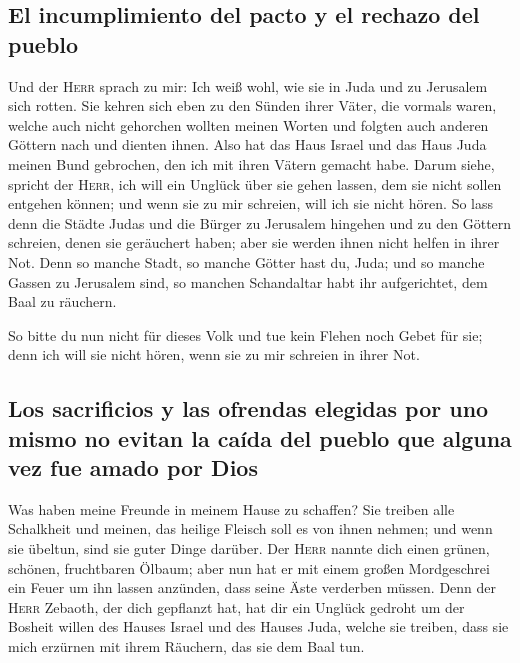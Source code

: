 \hypertarget{el-incumplimiento-del-pacto-y-el-rechazo-del-pueblo}{%
\subsection{El incumplimiento del pacto y el rechazo del
pueblo}\label{el-incumplimiento-del-pacto-y-el-rechazo-del-pueblo}}

 Und der \textsc{Herr} sprach zu mir: Ich weiß wohl, wie
sie in Juda und zu Jerusalem sich rotten.  Sie kehren
sich eben zu den Sünden ihrer Väter, die vormals waren, welche auch
nicht gehorchen wollten meinen Worten und folgten auch anderen Göttern
nach und dienten ihnen. Also hat das Haus Israel und das Haus Juda
meinen Bund gebrochen, den ich mit ihren Vätern gemacht habe.
 Darum siehe, spricht der \textsc{Herr}, ich will ein
Unglück über sie gehen lassen, dem sie nicht sollen entgehen können; und
wenn sie zu mir schreien, will ich sie nicht hören.  So
lass denn die Städte Judas und die Bürger zu Jerusalem hingehen und zu
den Göttern schreien, denen sie geräuchert haben; aber sie werden ihnen
nicht helfen in ihrer Not.  Denn so manche Stadt, so
manche Götter hast du, Juda; und so manche Gassen zu Jerusalem sind, so
manchen Schandaltar habt ihr aufgerichtet, dem Baal zu räuchern.

 So bitte du nun nicht für dieses Volk und tue kein
Flehen noch Gebet für sie; denn ich will sie nicht hören, wenn sie zu
mir schreien in ihrer Not.

\hypertarget{los-sacrificios-y-las-ofrendas-elegidas-por-uno-mismo-no-evitan-la-cauxedda-del-pueblo-que-alguna-vez-fue-amado-por-dios}{%
\subsection{Los sacrificios y las ofrendas elegidas por uno mismo no
evitan la caída del pueblo que alguna vez fue amado por
Dios}\label{los-sacrificios-y-las-ofrendas-elegidas-por-uno-mismo-no-evitan-la-cauxedda-del-pueblo-que-alguna-vez-fue-amado-por-dios}}

 Was haben meine Freunde in meinem Hause zu schaffen? Sie
treiben alle Schalkheit und meinen, das heilige Fleisch soll es von
ihnen nehmen; und wenn sie übeltun, sind sie guter Dinge darüber.
 Der \textsc{Herr} nannte dich einen grünen, schönen,
fruchtbaren Ölbaum; aber nun hat er mit einem großen Mordgeschrei ein
Feuer um ihn lassen anzünden, dass seine Äste verderben müssen.
 Denn der \textsc{Herr} Zebaoth, der dich gepflanzt hat,
hat dir ein Unglück gedroht um der Bosheit willen des Hauses Israel und
des Hauses Juda, welche sie treiben, dass sie mich erzürnen mit ihrem
Räuchern, das sie dem Baal tun.

